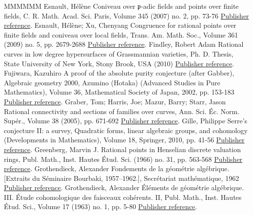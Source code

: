 \documentclass[11pt]{article}
\theoremstyle{definition}
\numberwithin{equation}{section}
\numberwithin{figure}{section}
\numberwithin{table}{section}
\begin{document}
\begin{thebibliography}{MMMMMM}
 Esnault, Hélène Coniveau over \(\mathfrak{p}\)-adic fields and points over finite fields, C. R. Math. Acad. Sci. Paris, Volume 345 (2007) no. 2, pp. 73-76 \href{https://ahl.centre-mersenne.org/item/AHL_2020__3__1399_0/#Esnaultpadic}{Publisher reference}.
 Esnault, Hélène; Xu, Chenyang Congruence for rational points over finite fields and coniveau over local fields, Trans. Am. Math. Soc., Volume 361 (2009) no. 5, pp. 2679-2688 \href{https://ahl.centre-mersenne.org/item/AHL_2020__3__1399_0/#EsnaultXu}{Publisher reference}.
 Findley, Robert Adam Rational curves in low degree hypersurfaces of Grassmannian varieties, Ph. D. Thesis, State University of New York, Stony Brook, USA (2010) \href{https://ahl.centre-mersenne.org/item/AHL_2020__3__1399_0/#Findley}{Publisher reference}.
 Fujiwara, Kazuhiro A proof of the absolute purity conjecture (after Gabber), Algebraic geometry 2000, Azumino (Hotaka) (Advanced Studies in Pure Mathematics), Volume 36, Mathematical Society of Japan, 2002, pp. 153-183 \href{https://ahl.centre-mersenne.org/item/AHL_2020__3__1399_0/#Fujiwara}{Publisher reference}.
 Graber, Tom; Harris, Joe; Mazur, Barry; Starr, Jason Rational connectivity and sections of families over curves, Ann. Sci. Éc. Norm. Supér., Volume 38 (2005), pp. 671-692 \href{https://ahl.centre-mersenne.org/item/AHL_2020__3__1399_0/#GHMS}{Publisher reference}.
 Gille, Philippe Serre’s conjecture II: a survey, Quadratic forms, linear algebraic groups, and cohomology (Developments in Mathematics), Volume 18, Springer, 2010, pp. 41-56 \href{https://ahl.centre-mersenne.org/item/AHL_2020__3__1399_0/#GilleSII}{Publisher reference}.
 Greenberg, Marvin J. Rational points in Henselian discrete valuation rings, Publ. Math., Inst. Hautes Étud. Sci. (1966) no. 31, pp. 563-568 \href{https://ahl.centre-mersenne.org/item/AHL_2020__3__1399_0/#Greenberg84}{Publisher reference}.
 Grothendieck, Alexander Fondements de la géométrie algébrique. [Extraits du Séminaire Bourbaki, 1957–1962.], Secrétariat mathématique, 1962 \href{https://ahl.centre-mersenne.org/item/AHL_2020__3__1399_0/#FGA}{Publisher reference}.
 Grothendieck, Alexander Éléments de géométrie algébrique. III. Étude cohomologique des faisceaux cohérents. II, Publ. Math., Inst. Hautes Étud. Sci., Volume 17 (1963) no. 1, pp. 5-80 \href{https://ahl.centre-mersenne.org/item/AHL_2020__3__1399_0/#EGA3}{Publisher reference}.

\end{thebibliography}
\end{document}
